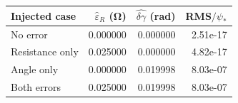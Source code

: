 \begin{tabular}{lrrr}
\toprule
Injected case & $\hat\varepsilon_R$ (\si{\ohm}) & $\widehat{\delta\gamma}$ (rad) & RMS$/\psi_*$\\
\midrule
No error & 0.000000 & 0.000000 & 2.51e-17 \\
Resistance only & 0.025000 & 0.000000 & 4.82e-17 \\
Angle only & 0.000000 & 0.019998 & 8.03e-07 \\
Both errors & 0.025000 & 0.019998 & 8.03e-07 \\
\bottomrule
\end{tabular}
